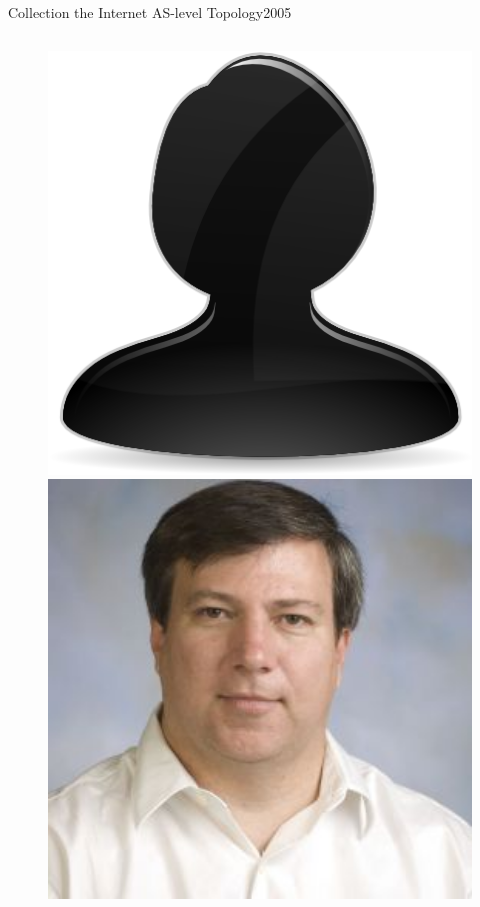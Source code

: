 \documentclass[ngerman,compress,hyperref={bookmarks}]{beamer}
\begin{document}
\begin{frame}{Collection the Internet AS-level Topology}{2005}
\begin{columns}[c]
\begin{column}{0.08\textwidth}
\begin{figure}
   \includegraphics[width=1\textwidth]{images/person}\\
   \includegraphics[width=1\textwidth]{images/massey}\\

\end{figure}
\end{column}
\end{columns}
\end{frame}
\end{document}
